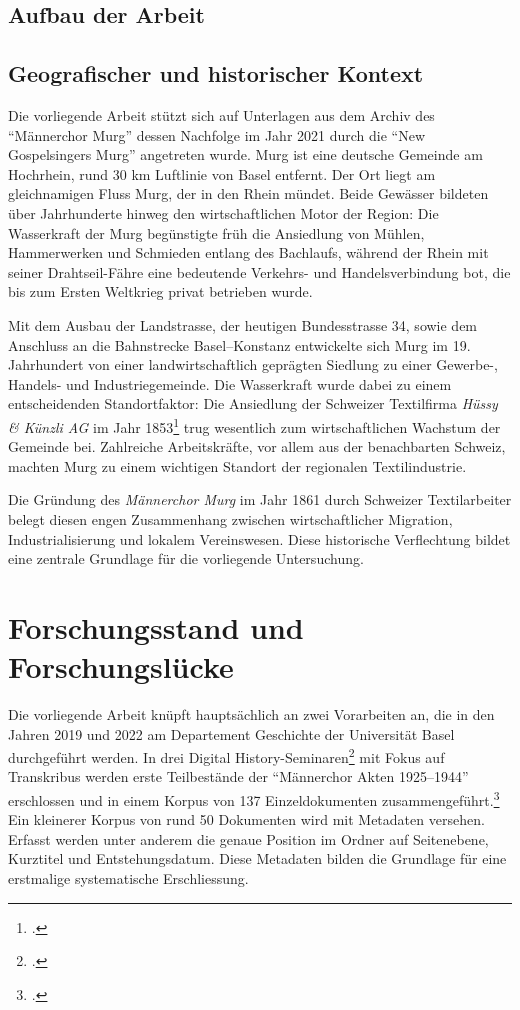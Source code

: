 \documentclass[12pt, a4paper, ngerman, bidi=default]{article}
\let\cite\footcite
\begin{document}
\subsection{Aufbau der Arbeit}
\subsection{Geografischer und historischer Kontext}
Die vorliegende Arbeit stützt sich auf Unterlagen aus dem Archiv des \enquote{Männerchor Murg} dessen Nachfolge im Jahr 2021 
durch die \enquote{New Gospelsingers Murg} angetreten wurde. Murg ist eine deutsche Gemeinde am Hochrhein, 
rund 30 km Luftlinie von Basel entfernt. Der Ort liegt am gleichnamigen Fluss Murg, der in den Rhein mündet. 
Beide Gewässer bildeten über Jahrhunderte hinweg den wirtschaftlichen Motor der Region: Die Wasserkraft der Murg 
begünstigte früh die Ansiedlung von Mühlen, Hammerwerken und Schmieden entlang des Bachlaufs, während der Rhein mit seiner 
Drahtseil-Fähre eine bedeutende Verkehrs- und Handelsverbindung bot, die bis zum Ersten Weltkrieg privat betrieben wurde.

Mit dem Ausbau der Landstrasse, der heutigen Bundesstrasse 34, sowie dem Anschluss an die Bahnstrecke Basel–Konstanz 
entwickelte sich Murg im 19. Jahrhundert von einer landwirtschaftlich geprägten Siedlung zu einer Gewerbe-, Handels- und 
Industriegemeinde. Die Wasserkraft wurde dabei zu einem entscheidenden Standortfaktor: Die Ansiedlung der Schweizer 
Textilfirma \textit{Hüssy \& Künzli AG} im Jahr 1853\cite[vgl.][]{gemeinde_murg_geschichte_nodate} trug wesentlich 
zum wirtschaftlichen Wachstum der Gemeinde bei. Zahlreiche Arbeitskräfte, vor allem aus der benachbarten Schweiz, 
machten Murg zu einem wichtigen Standort der regionalen Textilindustrie.

Die Gründung des \textit{Männerchor Murg} im Jahr 1861 durch Schweizer Textilarbeiter belegt diesen engen Zusammenhang 
zwischen wirtschaftlicher Migration, Industrialisierung und lokalem Vereinswesen. Diese historische Verflechtung bildet 
eine zentrale Grundlage für die vorliegende Untersuchung.


  

\newpage
\section{Forschungsstand und Forschungslücke}\label{subsec:forschungsstand}

Die vorliegende Arbeit knüpft hauptsächlich an zwei Vorarbeiten an, die in den Jahren 2019 und 2022 am Departement Geschichte der Universität Basel durchgeführt
werden. In drei Digital History-Seminaren\cite[vgl.][]{hodel_machine_2019, serif_digital_2019, serif_von_2022} mit Fokus auf Transkribus werden erste Teilbestände der \enquote{Männerchor Akten 1925--1944} erschlossen und in einem Korpus
von 137 Einzeldokumenten zusammengeführt.\cite[vgl.][]{burkhardt_feldpost_2022}
Ein kleinerer Korpus von rund 50 Dokumenten wird mit Metadaten versehen. Erfasst werden unter anderem die genaue Position im Ordner auf Seitenebene, 
Kurztitel und Entstehungsdatum. Diese Metadaten bilden die Grundlage für eine erstmalige systematische Erschliessung.
\end{document}
